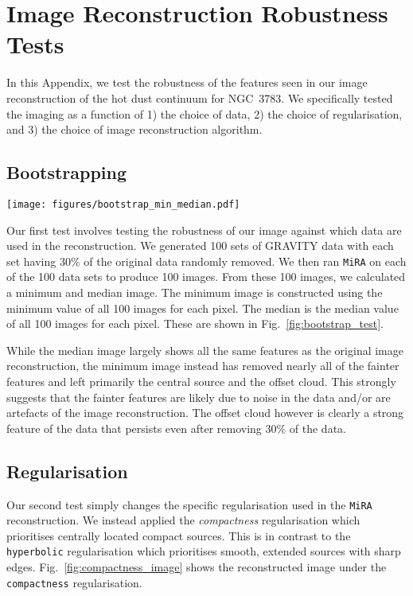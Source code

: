 \documentclass[longauth,]{aa}
\begin{document}
\section{Image Reconstruction Robustness Tests}\label{app:mira_tests}
In this Appendix, we test the robustness of the features seen in our image reconstruction of the hot dust continuum for NGC~3783. We specifically tested the imaging as a function of 1) the choice of data, 2) the choice of regularisation, and 3) the choice of image reconstruction algorithm.

\subsection{Bootstrapping}

\begin{figure*}
    \centering
    \texttt{[image: figures/bootstrap\_min\_median.pdf]}
    \caption{Minimum (left) and median images from our bootstrapping analysis of our image reconstruction. Values in the minimum image are determined as the minimum value from all 100 images produced. Values in the median image are the median value of all 100 images.}
    \label{fig:bootstrap_test}
\end{figure*}

Our first test involves testing the robustness of our image against which data are used in the reconstruction. We generated 100 sets of GRAVITY data with each set having 30\% of the original data randomly removed. We then ran \texttt{MiRA} on each of the 100 data sets to produce 100 images. From these 100 images, we calculated a minimum and median image. The minimum image is constructed using the minimum value of all 100 images for each pixel. The median is the median value of all 100 images for each pixel. These are shown in Fig.~\ref{fig:bootstrap_test}.

While the median image largely shows all the same features as the original image reconstruction, the minimum image instead has removed nearly all of the fainter features and left primarily the central source and the offset cloud. This strongly suggests that the fainter features are likely due to noise in the data and/or are artefacts of the image reconstruction. The offset cloud however is clearly a strong feature of the data that persists even after removing 30\% of the data.

\subsection{Regularisation}
Our second test simply changes the specific regularisation used in the \texttt{MiRA} reconstruction. We instead applied the \textit{compactness} regularisation which prioritises centrally located compact sources. This is in contrast to the \texttt{hyperbolic} regularisation which prioritises smooth, extended sources with sharp edges. Fig.~\ref{fig:compactness_image} shows the reconstructed image under the \texttt{compactness} regularisation. 
\end{document}
